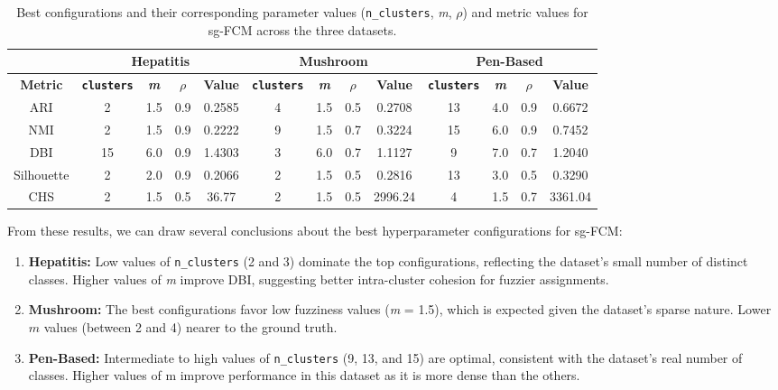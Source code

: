 \begin{table}[h!]
	\centering
	\begin{tabular}{|c|cccc|cccc|cccc|}
		\hline
		& \multicolumn{4}{c|}{\textbf{Hepatitis}} & \multicolumn{4}{c|}{\textbf{Mushroom}} & \multicolumn{4}{c|}{\textbf{Pen-Based}} \\ \hline
		\textbf{Metric} & \textbf{\texttt{clusters}} & \textbf{\textit{m}} & \textbf{\(\rho\)} & \textbf{Value} & 
		\textbf{\texttt{clusters}} & \textbf{\textit{m}} & \textbf{\(\rho\)} & \textbf{Value} & 
		\textbf{\texttt{clusters}} & \textbf{\textit{m}} & \textbf{\(\rho\)} & \textbf{Value} \\ \hline
		ARI            & 2           & 1.5         & 0.9   & 0.2585 & 
		4           & 1.5         & 0.5   & 0.2708 & 
		13          & 4.0         & 0.9   & 0.6672 \\ \hline
		NMI            & 2           & 1.5         & 0.9   & 0.2222 & 
		9           & 1.5         & 0.7   & 0.3224 & 
		15          & 6.0         & 0.9   & 0.7452 \\ \hline
		DBI            & 15          & 6.0         & 0.9   & 1.4303 & 
		3           & 6.0         & 0.7   & 1.1127 & 
		9           & 7.0         & 0.7   & 1.2040 \\ \hline
		Silhouette     & 2           & 2.0         & 0.9   & 0.2066 & 
		2           & 1.5         & 0.5   & 0.2816 & 
		13          & 3.0         & 0.5   & 0.3290 \\ \hline
		CHS            & 2           & 1.5         & 0.5   & 36.77  & 
		2           & 1.5         & 0.5   & 2996.24 & 
		4           & 1.5         & 0.7   & 3361.04 \\ \hline
	\end{tabular}
	\caption{Best configurations and their corresponding parameter values (\texttt{n\_clusters}, \textit{m}, \(\rho\)) and metric values for sg-FCM across the three datasets.}
	\label{tab:sgfcm:best_runs}
\end{table}

From these results, we can draw several conclusions about the best hyperparameter configurations for sg-FCM:
\begin{enumerate}
	\item \textbf{Hepatitis:} Low values of \texttt{n\_clusters} (2 and 3) dominate the top configurations, reflecting the dataset's small number of distinct classes. Higher values of \textit{m} improve DBI, suggesting better intra-cluster cohesion for fuzzier assignments.
	
	\item \textbf{Mushroom:} The best configurations favor low fuzziness values (\textit{m} = 1.5), which is expected given the dataset's sparse nature. Lower \(m\) values (between 2 and 4) nearer to the ground truth.
	
	\item \textbf{Pen-Based:} Intermediate to high values of \texttt{n\_clusters} (9, 13, and 15) are optimal, consistent with the dataset's real number of classes. Higher values of m improve performance in this dataset as it is more dense than the others.
\end{enumerate}

